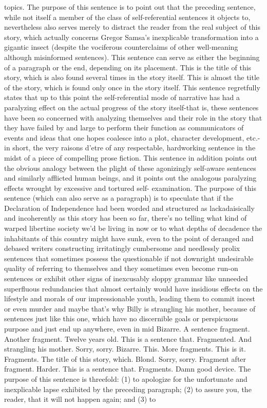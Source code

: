 topics. The purpose of this sentence is to point out that the preceding sentence, while not itself a member of the class of self-referential sentences it objects to, nevertheless also serves merely to distract the reader from the real subject of this story, which actually concerns Gregor Samsa's inexplicable transformation into a gigantic insect (despite the vociferous counterclaims of other well-meaning although misinformed sentences). This sentence can serve as either the beginning of a paragraph or the end, depending on its placement. This is the title of this story, which is also found several times in the story itself. This is almost the title of the story, which is found only once in the story itself. This sentence regretfully states that up to this point the self-referential mode of narrative has had a paralyzing effect on the actual progress of the story itself-that is, these sentences have been so concerned with analyzing themselves and their role in the story that they have failed by and large to perform their function as communicators of events and ideas that one hopes coalesce into a plot, character development, etc.-in short, the very raisons d'etre of any respectable, hardworking sentence in the midst of a piece of compelling prose fiction. This sentence in addition points out the obvious analogy between the plight of these agonizingly self-aware sentences and similarly afflicted human beings, and it points out the analogous paralyzing effects wrought by excessive and tortured self- examination. The purpose of this sentence (which can also serve as a paragraph) is to speculate that if the Declaration of Independence had been worded and structured as lackadaisically and incoherently as this story has been so far, there's no telling what kind of warped libertine society we'd be living in now or to what depths of decadence the inhabitants of this country might have sunk, even to the point of deranged and debased writers constructing irritatingly cumbersome and needlessly prolix sentences that sometimes possess the questionable if not downright undesirable quality of referring to themselves and they sometimes even become run-on sentences or exhibit other signs of inexcusably sloppy grammar like unneeded superfluous redundancies that almost certainly would have insidious effects on the lifestyle and morals of our impressionable youth, leading them to commit incest or even murder and maybe that's why Billy is strangling his mother, because of sentences just like this one, which have no discernible goals or perspicuous purpose and just end up anywhere, even in mid Bizarre. A sentence fragment. Another fragment. Twelve years old. This is a sentence that. Fragmented. And strangling his mother. Sorry, sorry. Bizarre. This. More fragments. This is it. Fragments. The title of this story, which. Blond. Sorry, sorry. Fragment after fragment. Harder. This is a sentence that. Fragments. Damn good device. The purpose of this sentence is threefold: (1) to apologize for the unfortunate and inexplicable lapse exhibited by the preceding paragraph; (2) to assure you, the reader, that it will not happen again; and (3) to 



